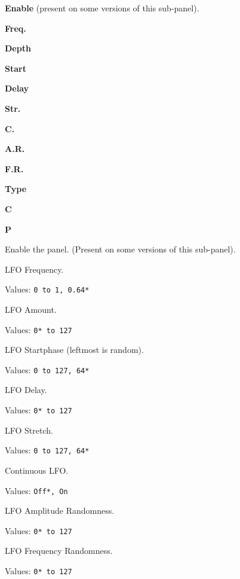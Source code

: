    \begin{enumber}
      \item \textbf{Enable} (present on some versions of this sub-panel).
      \item \textbf{Freq.}
      \item \textbf{Depth}
      \item \textbf{Start}
      \item \textbf{Delay}
      \item \textbf{Str.}
      \item \textbf{C.}
      \item \textbf{A.R.}
      \item \textbf{F.R.}
      \item \textbf{Type}
      \item \textbf{C}
      \item \textbf{P}
   \end{enumber}

   \setcounter{ItemCounter}{0}      %

   Enable the panel.  (Present on some versions of this sub-panel).

   LFO Frequency.

   Values: \texttt{0 to 1, 0.64*}

   LFO Amount.

   Values: \texttt{0* to 127}

   LFO Startphase (leftmost is random).

   Values: \texttt{0 to 127, 64*}

   LFO Delay.

   Values: \texttt{0* to 127}

   LFO Stretch.

   Values: \texttt{0 to 127, 64*}

   Continuous LFO.

   Values: \texttt{Off*, On}

   LFO Amplitude Randomness.

   Values: \texttt{0* to 127}

   LFO Frequency Randomness.

   Values: \texttt{0* to 127}


